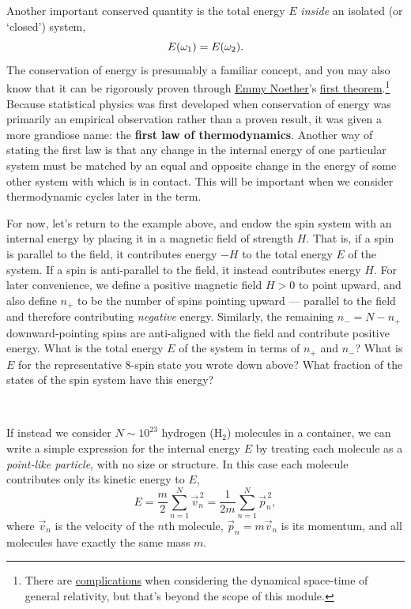 Another important conserved quantity is the total energy $E$ \textit{inside} an isolated (or `closed') system,
\begin{equation*}
  E(\omega_1) = E(\omega_2).
\end{equation*}
The conservation of energy is presumably a familiar concept, and you may also know that it can be rigorously proven through \href{https://en.wikipedia.org/wiki/Emmy_Noether}{Emmy Noether}'s \href{https://en.wikipedia.org/wiki/Noether's_theorem}{first theorem}.\footnote{There are \href{https://www.preposterousuniverse.com/blog/2010/02/22/energy-is-not-conserved/}{complications} when considering the dynamical space-time of general relativity, but that's beyond the scope of this module.}
Because statistical physics was first developed when conservation of energy was primarily an empirical observation rather than a proven result, it was given a more grandiose name: the \textbf{first law of thermodynamics}.
Another way of stating the first law is that any change in the internal energy of one particular system \Om must be matched by an equal and opposite change in the energy of some other system with which \Om is in contact.
This will be important when we consider thermodynamic cycles later in the term.

For now, let's return to the example above, and endow the spin system with an internal energy by placing it in a magnetic field of strength $H$.
That is, if a spin is parallel to the field, it contributes energy $-H$ to the total energy $E$ of the system. %
If a spin is anti-parallel to the field, it instead contributes energy $H$.
For later convenience, we define a positive magnetic field $H > 0$ to point upward, and also define $n_+$ to be the number of spins pointing upward --- parallel to the field and therefore contributing \textit{negative} energy.
Similarly, the remaining $n_- = N - n_+$ downward-pointing spins are anti-aligned with the field and contribute positive energy.
What is the total energy $E$ of the system in terms of $n_+$ and $n_-$?
What is $E$ for the representative $8$-spin state you wrote down above?
What fraction of the states of the spin system have this energy?
\begin{mdframed}
  \ \\[100 pt]
\end{mdframed}

If instead we consider $N \sim 10^{23}$ hydrogen (H$_2$) molecules in a container, we can write a simple expression for the internal energy $E$ by treating each molecule as a \textit{point-like particle}, with no size or structure.
In this case each molecule contributes only its kinetic energy to $E$,
\begin{equation*}
  E = \frac{m}{2} \sum_{n = 1}^N \vec{v}_n^{\,2} = \frac{1}{2m} \sum_{n = 1}^N \vec{p}_n^{\,2},
\end{equation*}
where $\vec v_n$ is the velocity of the $n$th molecule, $\vec p_n = m \vec v_n$ is its momentum, and all molecules have exactly the same mass $m$.

